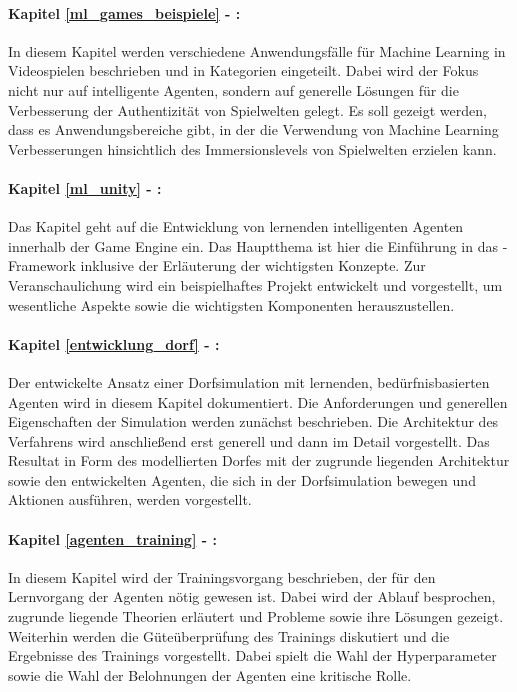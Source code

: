 \paragraph{Kapitel \ref{ml_games_beispiele} - :}
In diesem Kapitel werden verschiedene Anwendungsfälle für Machine Learning in Videospielen beschrieben und in Kategorien eingeteilt. Dabei wird der Fokus nicht nur auf intelligente Agenten, sondern auf generelle Lösungen für die Verbesserung der Authentizität von Spielwelten gelegt. Es soll gezeigt werden, dass es Anwendungsbereiche gibt, in der die Verwendung von Machine Learning Verbesserungen hinsichtlich des Immersionslevels von Spielwelten erzielen kann.

\paragraph{Kapitel \ref{ml_unity} - :}
Das Kapitel geht auf die Entwicklung von lernenden intelligenten Agenten innerhalb der Game Engine  ein. Das Hauptthema ist hier die Einführung in das -Framework inklusive der Erläuterung der wichtigsten Konzepte. Zur Veranschaulichung wird ein beispielhaftes Projekt entwickelt und vorgestellt, um wesentliche Aspekte sowie die wichtigsten Komponenten herauszustellen.

\paragraph{Kapitel \ref{entwicklung_dorf} - :}
Der entwickelte Ansatz einer Dorfsimulation mit lernenden, bedürfnisbasierten Agenten wird in diesem Kapitel dokumentiert. Die Anforderungen und generellen Eigenschaften der Simulation werden zunächst beschrieben. Die Architektur des Verfahrens wird anschließend erst generell und dann im Detail vorgestellt. Das Resultat in Form des modellierten Dorfes mit der zugrunde liegenden Architektur sowie den entwickelten Agenten, die sich in der Dorfsimulation bewegen und Aktionen ausführen, werden vorgestellt.

\paragraph{Kapitel \ref{agenten_training} - :}
In diesem Kapitel wird der Trainingsvorgang beschrieben, der für den Lernvorgang der Agenten nötig gewesen ist. Dabei wird der Ablauf besprochen, zugrunde liegende Theorien erläutert und Probleme sowie ihre Lösungen gezeigt. Weiterhin werden die Güteüberprüfung des Trainings diskutiert und die Ergebnisse des Trainings vorgestellt. Dabei spielt die Wahl der Hyperparameter sowie die Wahl der Belohnungen der Agenten eine kritische Rolle.

